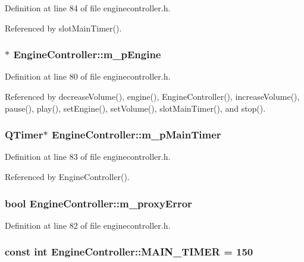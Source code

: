 Definition at line 84 of file enginecontroller.h.

Referenced by slot\-Main\-Timer().
\subsubsection{$\ast$ {\bf Engine\-Controller::m\_\-p\-Engine}\hspace{0.3cm}{\tt  [private]}}\label{classEngineController_EngineControllerr0}




Definition at line 80 of file enginecontroller.h.

Referenced by decrease\-Volume(), engine(), Engine\-Controller(), increase\-Volume(), pause(), play(), set\-Engine(), set\-Volume(), slot\-Main\-Timer(), and stop().
\subsubsection{\setlength{\rightskip}{0pt plus 5cm}QTimer$\ast$ {\bf Engine\-Controller::m\_\-p\-Main\-Timer}\hspace{0.3cm}{\tt  [private]}}\label{classEngineController_EngineControllerr3}




Definition at line 83 of file enginecontroller.h.

Referenced by Engine\-Controller().
\subsubsection{\setlength{\rightskip}{0pt plus 5cm}bool {\bf Engine\-Controller::m\_\-proxy\-Error}\hspace{0.3cm}{\tt  [private]}}\label{classEngineController_EngineControllerr2}




Definition at line 82 of file enginecontroller.h.
\subsubsection{\setlength{\rightskip}{0pt plus 5cm}const int {\bf Engine\-Controller::MAIN\_\-TIMER} = 150\hspace{0.3cm}{\tt  [static, private]}}\label{classEngineController_EngineControllerv0}




